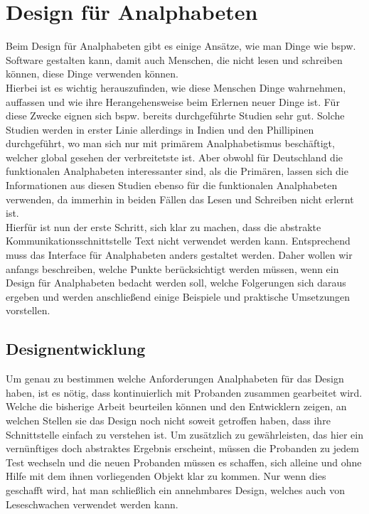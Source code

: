 \section{Design für Analphabeten}

Beim Design für Analphabeten gibt es einige Ansätze, wie man Dinge wie bspw. Software gestalten kann, damit auch Menschen, die nicht lesen und schreiben können, diese Dinge verwenden können.\\
Hierbei ist es wichtig herauszufinden, wie diese Menschen Dinge wahrnehmen, auffassen und wie ihre Herangehensweise beim Erlernen neuer Dinge ist. Für diese Zwecke eignen sich bspw. bereits durchgeführte Studien sehr gut. Solche Studien werden in erster Linie allerdings in Indien und den Phillipinen durchgeführt, wo man sich nur mit primärem Analphabetismus beschäftigt, welcher global gesehen der verbreitetste ist. Aber obwohl für Deutschland die funktionalen Analphabeten interessanter sind, als die Primären, lassen sich die Informationen aus diesen Studien ebenso für die funktionalen Analphabeten verwenden, da immerhin in beiden Fällen das Lesen und Schreiben nicht erlernt ist.\\
Hierfür ist nun der erste Schritt, sich klar zu machen, dass die abstrakte Kommunikationsschnittstelle Text nicht verwendet werden kann. Entsprechend muss das Interface für Analphabeten anders gestaltet werden. Daher wollen wir anfangs beschreiben, welche Punkte berücksichtigt werden müssen, wenn ein Design für Analphabeten bedacht werden soll, welche Folgerungen sich daraus ergeben und werden anschließend einige Beispiele und praktische Umsetzungen vorstellen.

\subsection{Designentwicklung}
Um genau zu bestimmen welche Anforderungen Analphabeten für das Design haben, ist es nötig, dass kontinuierlich mit Probanden zusammen gearbeitet wird. Welche die bisherige Arbeit beurteilen können und den Entwicklern zeigen, an welchen Stellen sie das Design noch nicht soweit getroffen haben, dass ihre Schnittstelle einfach zu verstehen ist. Um zusätzlich zu gewährleisten, das hier ein vernünftiges doch abstraktes Ergebnis erscheint, müssen die Probanden zu jedem Test wechseln und die neuen Probanden müssen es schaffen, sich alleine und ohne Hilfe mit dem ihnen vorliegenden Objekt klar zu kommen. Nur wenn dies geschafft wird, hat man schließlich ein annehmbares Design, welches auch von Leseschwachen verwendet werden kann.\\

